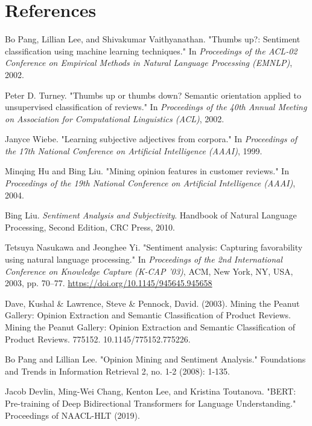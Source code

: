 \documentclass[12pt]{article}
\begin{document}
\section*{References}
\begin{thebibliography}{}

Bo Pang, Lillian Lee, and Shivakumar Vaithyanathan. "Thumbs up?: Sentiment classification using machine learning techniques." In \textit{Proceedings of the ACL-02 Conference on Empirical Methods in Natural Language Processing (EMNLP)}, 2002.

Peter D. Turney. "Thumbs up or thumbs down? Semantic orientation applied to unsupervised classification of reviews." In \textit{Proceedings of the 40th Annual Meeting on Association for Computational Linguistics (ACL)}, 2002.

Janyce Wiebe. "Learning subjective adjectives from corpora." In \textit{Proceedings of the 17th National Conference on Artificial Intelligence (AAAI)}, 1999.

Minqing Hu and Bing Liu. "Mining opinion features in customer reviews." In \textit{Proceedings of the 19th National Conference on Artificial Intelligence (AAAI)}, 2004.

Bing Liu. \textit{Sentiment Analysis and Subjectivity}. Handbook of Natural Language Processing, Second Edition, CRC Press, 2010.

Tetsuya Nasukawa and Jeonghee Yi. "Sentiment analysis: Capturing favorability using natural language processing." In \textit{Proceedings of the 2nd International Conference on Knowledge Capture (K-CAP '03)}, ACM, New York, NY, USA, 2003, pp. 70–77. \url{https://doi.org/10.1145/945645.945658}

Dave, Kushal \& Lawrence, Steve \& Pennock, David. (2003). Mining the Peanut Gallery: Opinion Extraction and Semantic Classification of Product Reviews. Mining the Peanut Gallery: Opinion Extraction and Semantic Classification of Product Reviews. 775152. 10.1145/775152.775226. 

Bo Pang and Lillian Lee. "Opinion Mining and Sentiment Analysis." Foundations and Trends in Information Retrieval 2, no. 1-2 (2008): 1-135.

Jacob Devlin, Ming-Wei Chang, Kenton Lee, and Kristina Toutanova. "BERT: Pre-training of Deep Bidirectional Transformers for Language Understanding." Proceedings of NAACL-HLT (2019).


\end{thebibliography}
\end{document}
